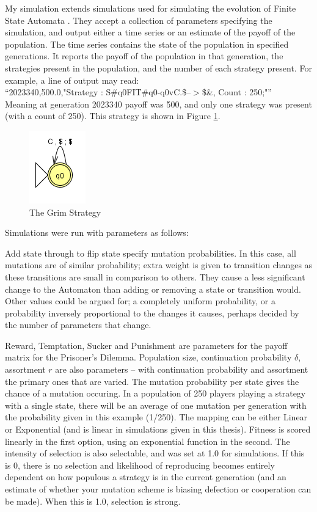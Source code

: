 \documentclass[a4paper,11pt,bcshonoursthesis,singlespace,oneside,thesisdraft,pdflatex]{cssethesis}
\begin{document}
My simulation extends simulations used for simulating the evolution of Finite State Automata \citep{van-veelen:PNAS:2012, jggit}. 
They accept a collection of parameters specifying the simulation, and output either a time series or an estimate of the payoff of the population. 
The time series contains the state of the population in specified generations. 
It reports the payoff of the population in that generation, the strategies present in the population, and the number of each strategy present. For example, a line of output may read:\\
``2023340,500.0,"Strategy : S\#q0FIT\#q0-q0vC.\$--$>$\$\&, Count : 250;"''\\
Meaning at generation 2023340 payoff was 500, and only one strategy was present (with a count of 250). 
This strategy is shown in Figure \ref{fig:grim}. 

\begin{figure}[h]
\centering
\includegraphics{grim}
\caption{The Grim Strategy}
\label{fig:grim}
\end{figure}
\pagebreak
Simulations were run with parameters as follows:

Add state through to flip state specify mutation probabilities. 
In this case, all mutations are of similar probability; extra weight is given to transition changes as these transitions are small in comparison to others. 
They cause a less significant change to the Automaton than adding or removing a state or transition would.  
Other values could be argued for; a completely uniform probability, or a probability inversely proportional to the changes it causes, perhaps decided by the number of parameters that change. 

Reward, Temptation, Sucker and Punishment are parameters for the payoff matrix for the Prisoner's Dilemma. 
Population size, continuation probability $\delta$, assortment $r$ are also parameters -- with continuation probability and assortment the primary ones that are varied. 
The mutation probability per state gives the chance of a mutation occuring. In a population of 250 players playing a strategy with a single state, there will be an average of one mutation per generation with the probability given in this example (1/250). The mapping can be either Linear or Exponential (and is linear in simulations given in this thesis). 
Fitness is scored linearly in the first option, using an exponential function in the second. 
The intensity of selection is also selectable, and was set at 1.0 for simulations. 
If this is 0, there is no selection and likelihood of reproducing becomes entirely dependent on how populous a strategy is in the current generation (and an estimate of whether your mutation scheme is biasing defection or cooperation can be made). When this is 1.0, selection is strong. 
\end{document}
